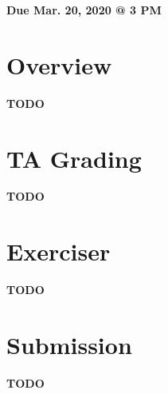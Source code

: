 \documentclass[11pt]{article}
\makeatletter
\def\datedue{Mar. 20, 2020 @ 3 PM}
\makeatother
\begin{document}
\maketitle \thispagestyle{fancy}

\hfill {\large \textbf{Due \datedue}}


\section{Overview}
\label{sec:overview}
\textbf{TODO}

\section{TA Grading}
\label{sec:tagrading}
\textbf{TODO}

\section{Exerciser}
\label{sec:exercise}
\textbf{TODO}

\section{Submission}
\label{sec:submission}
\textbf{TODO}
\end{document}
